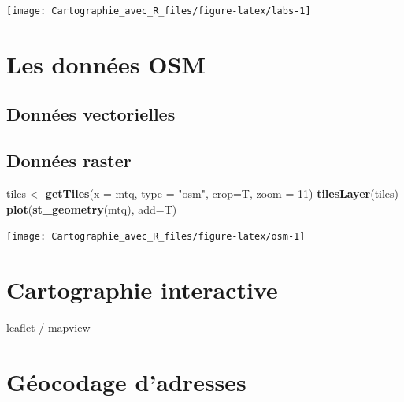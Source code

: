 \documentclass[]{book}
\newenvironment{Shaded}{\begin{snugshade}}{\end{snugshade}}
\newcommand{\DataTypeTok}[1]{\textcolor[rgb]{0.13,0.29,0.53}{#1}}
\newcommand{\DecValTok}[1]{\textcolor[rgb]{0.00,0.00,0.81}{#1}}
\newcommand{\KeywordTok}[1]{\textcolor[rgb]{0.13,0.29,0.53}{\textbf{#1}}}
\newcommand{\NormalTok}[1]{#1}
\newcommand{\StringTok}[1]{\textcolor[rgb]{0.31,0.60,0.02}{#1}}
\begin{document}
\begin{center}\texttt{[image: Cartographie\_avec\_R\_files/figure-latex/labs-1]} \end{center}

\hypertarget{les-donnees-osm}{%
\section{Les données OSM}\label{les-donnees-osm}}

\hypertarget{donnees-vectorielles}{%
\subsection{Données vectorielles}\label{donnees-vectorielles}}

\hypertarget{donnees-raster}{%
\subsection{Données raster}\label{donnees-raster}}

\begin{Shaded}
\begin{Highlighting}[]
\NormalTok{tiles <-}\StringTok{ }\KeywordTok{getTiles}\NormalTok{(}\DataTypeTok{x =}\NormalTok{ mtq, }\DataTypeTok{type =} \StringTok{"osm"}\NormalTok{, }\DataTypeTok{crop=}\NormalTok{T, }\DataTypeTok{zoom =} \DecValTok{11}\NormalTok{)}
\KeywordTok{tilesLayer}\NormalTok{(tiles)}
\KeywordTok{plot}\NormalTok{(}\KeywordTok{st_geometry}\NormalTok{(mtq), }\DataTypeTok{add=}\NormalTok{T)}
\end{Highlighting}
\end{Shaded}

\begin{center}\texttt{[image: Cartographie\_avec\_R\_files/figure-latex/osm-1]} \end{center}

\hypertarget{cartographie-interactive}{%
\section{Cartographie interactive}\label{cartographie-interactive}}

leaflet / mapview

\hypertarget{geocodage-dadresses}{%
\section{Géocodage d'adresses}\label{geocodage-dadresses}}
\end{document}
